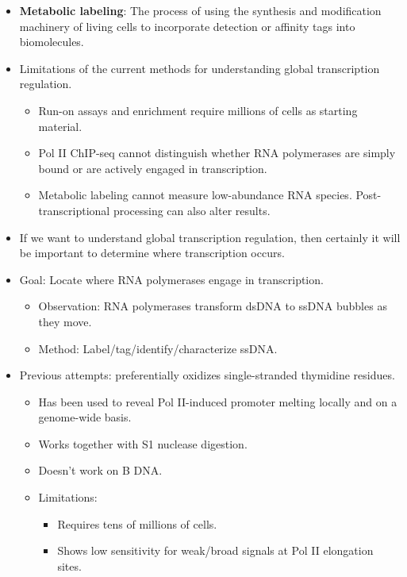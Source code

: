 \documentclass[../notes.tex]{subfiles}
\begin{document}
\begin{itemize}
\begin{enumerate}
    \end{enumerate}
    \item \textbf{Metabolic labeling}: The process of using the synthesis and modification machinery of living cells to incorporate detection or affinity tags into biomolecules.
    \item Limitations of the current methods for understanding global transcription regulation.
    \begin{itemize}
        \item Run-on assays and enrichment require millions of cells as starting material.
        \item Pol II ChIP-seq cannot distinguish whether RNA polymerases are simply bound or are actively engaged in transcription.
        \item Metabolic labeling cannot measure low-abundance RNA species. Post-transcriptional processing can also alter results.
    \end{itemize}
    \item If we want to understand global transcription regulation, then certainly it will be important to determine where transcription occurs.
    \item Goal: Locate where RNA polymerases engage in transcription.
    \begin{itemize}
        \item Observation: RNA polymerases transform dsDNA to ssDNA bubbles as they move.
        \item Method: Label/tag/identify/characterize ssDNA.
    \end{itemize}
    \item Previous attempts:  preferentially oxidizes single-stranded thymidine residues.
    \begin{itemize}
        \item Has been used to reveal Pol II-induced promoter melting locally and on a genome-wide basis.
        \item Works together with S1 nuclease digestion.
        \item Doesn't work on B DNA.
        \item Limitations:
        \begin{itemize}
            \item Requires tens of millions of cells.
            \item Shows low sensitivity for weak/broad signals at Pol II elongation sites.
        \end{itemize}
    \end{itemize}

\end{itemize}
\end{document}
